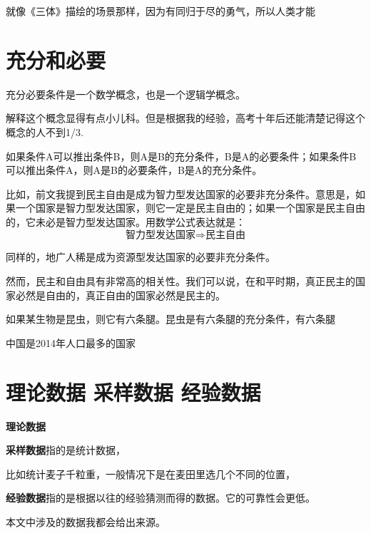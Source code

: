 就像《三体》描绘的场景那样，因为有同归于尽的勇气，所以人类才能

\section{充分和必要}
充分必要条件是一个数学概念，也是一个逻辑学概念。

解释这个概念显得有点小儿科。但是根据我的经验，高考十年后还能清楚记得这个概念的人不到1/3. 

如果条件A可以推出条件B，则A是B的充分条件，B是A的必要条件；如果条件B可以推出条件A，则A是B的必要条件，B是A的充分条件。

比如，前文我提到民主自由是成为智力型发达国家的必要非充分条件。意思是，如果一个国家是智力型发达国家，则它一定是民主自由的；如果一个国家是民主自由的，它未必是智力型发达国家。用数学公式表达就是：
\[ \mbox{智力型发达国家} \Rightarrow \mbox{民主自由}\]

同样的，地广人稀是成为资源型发达国家的必要非充分条件。

然而，民主和自由具有非常高的相关性。我们可以说，在和平时期，真正民主的国家必然是自由的，真正自由的国家必然是民主的。

如果某生物是昆虫，则它有六条腿。昆虫是有六条腿的充分条件，有六条腿

中国是2014年人口最多的国家


\section{理论数据 采样数据 经验数据}
\textbf{理论数据}

\textbf{采样数据}指的是统计数据，

比如统计麦子千粒重，一般情况下是在麦田里选几个不同的位置，

\textbf{经验数据}指的是根据以往的经验猜测而得的数据。它的可靠性会更低。

本文中涉及的数据我都会给出来源。